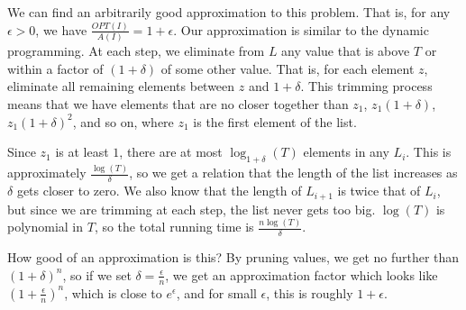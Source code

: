 We can find an arbitrarily good approximation to this problem.  That is, for any $\epsilon>0$, we have $\frac{OPT(I)}{A(I)}=1+\epsilon$.  Our approximation is similar to the dynamic programming.  At each step, we eliminate from $L$ any value that is above $T$ or within a factor of $(1+\delta)$ of some other value.  That is, for each element $z$, eliminate all remaining elements between $z$ and $1+\delta$.  This trimming process means that we have elements that are no closer together than $z_1$, $z_1(1+\delta)$, $z_1(1+\delta)^2$, and so on, where $z_1$ is the first element of the list.

Since $z_1$ is at least $1$, there are at most $\log_{1+\delta}(T)$ elements in any $L_i$.  This is approximately $\frac{\log(T)}{\delta}$, so we get a relation that the length of the list increases as $\delta$ gets closer to zero.  We also know that the length of $L_{i+1}$ is twice that of $L_i$, but since we are trimming at each step, the list never gets too big.  $\log(T)$ is polynomial in $T$, so the total running time is $\frac{n\log(T)}{\delta}$.

How good of an approximation is this?  By pruning values, we get no further than $(1+\delta)^n$, so if we set $\delta=\frac{\epsilon}{n}$, we get an approximation factor which looks like $(1+\frac{\epsilon}{n})^n$, which is close to $e^\epsilon$, and for small $\epsilon$, this is roughly $1+\epsilon$.



